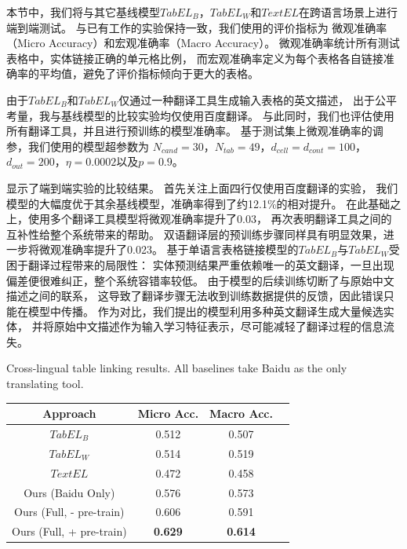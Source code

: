 本节中，我们将与其它基线模型$TabEL_B$，$TabEL_W$和$TextEL$在跨语言场景上进行端到端测试。
与已有工作的实验保持一致，我们使用的评价指标为
微观准确率（Micro Accuracy）和宏观准确率（Macro Accuracy）。
微观准确率统计所有测试表格中，实体链接正确的单元格比例，
而宏观准确率定义为每个表格各自链接准确率的平均值，避免了评价指标倾向于更大的表格。

由于$TabEL_B$和$TabEL_W$仅通过一种翻译工具生成输入表格的英文描述，
出于公平考量，我与基线模型的比较实验均仅使用百度翻译。
与此同时，我们也评估使用所有翻译工具，并且进行预训练的模型准确率。
基于测试集上微观准确率的调参，我们使用的模型超参数为
$N_{cand}=30$，$N_{tab}=49$，$d_{cell}=d_{cont}=100$，$d_{out}=200$，$\eta=0.0002$以及$p=0.9$。

显示了端到端实验的比较结果。
首先关注上面四行仅使用百度翻译的实验，
我们模型的大幅度优于其余基线模型，准确率得到了约12.1\%的相对提升。
在此基础之上，使用多个翻译工具模型将微观准确率提升了0.03，
再次表明翻译工具之间的互补性给整个系统带来的帮助。
双语翻译层的预训练步骤同样具有明显效果，进一步将微观准确率提升了0.023。
基于单语言表格链接模型的$TabEL_B$与$TabEL_W$受困于翻译过程带来的局限性：
实体预测结果严重依赖唯一的英文翻译，一旦出现偏差便很难纠正，整个系统容错率较低。
由于模型的后续训练切断了与原始中文描述之间的联系，
这导致了翻译步骤无法收到训练数据提供的反馈，因此错误只能在模型中传播。
作为对比，我们提出的模型利用多种英文翻译生成大量候选实体，
并将原始中文描述作为输入学习特征表示，尽可能减轻了翻译过程的信息流失。

\begin{table}[ht]
\centering
{}
{Cross-lingual table linking results. All baselines take Baidu as the only translating tool.}
\label{tab:tabel-main-result}
\begin{tabular} {c|c|cc}
    \hline
    Approach          & Micro Acc.   & Macro Acc.    \\
    \hline
    $TabEL_B$         &  0.512       & 0.507         \\
    $TabEL_W$         &  0.514       & 0.519         \\     %
    $TextEL$          &  0.472       & 0.458         \\
    \hline
    Ours (Baidu Only) &  0.576       & 0.573         \\
    Ours (Full, - pre-train) &  0.606    &  0.591        \\ 
    Ours (Full, + pre-train)  &  \textbf{0.629}       & \textbf{0.614}         \\
    \hline
\end{tabular}
\end{table}


